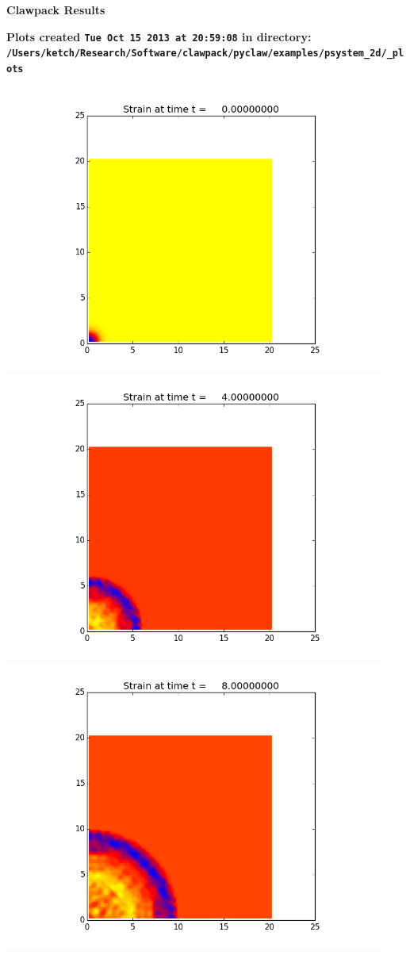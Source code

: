 \documentclass[11pt]{article}
\begin{document}
        \begin{center}{\Large\bf Clawpack Results}\vskip 5pt
        
        \bf Plots created {\tt Tue Oct 15 2013 at 20:59:08} in directory: \vskip 5pt
        \verb+/Users/ketch/Research/Software/clawpack/pyclaw/examples/psystem_2d/_plots+
        \end{center}
        \vskip 5pt
        \includegraphics[width=0.95\textwidth]{frame0000fig0.png}
\vskip 10pt 
\includegraphics[width=0.95\textwidth]{frame0001fig0.png}
\vskip 10pt 
\includegraphics[width=0.95\textwidth]{frame0002fig0.png}
\end{document}
